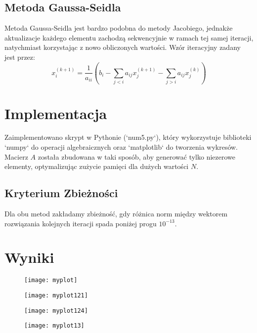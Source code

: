 \documentclass{article}
\begin{document}
\subsection{Metoda Gaussa-Seidla}
Metoda Gaussa-Seidla jest bardzo podobna do metody Jacobiego, jednakże aktualizacje każdego elementu zachodzą
sekwencyjnie w ramach tej samej iteracji, natychmiast korzystając z nowo obliczonych wartości. Wzór iteracyjny zadany jest przez:
\[
x_i^{(k+1)} = \frac{1}{a_{ii}} \left(b_i - \sum_{j < i} a_{ij} x_j^{(k+1)} - \sum_{j > i} a_{ij} x_j^{(k)} \right)
\]

\section{Implementacja}
Zaimplementowano skrypt w Pythonie (`num5.py`), który wykorzystuje biblioteki `numpy` do operacji algebraicznych oraz `matplotlib` do tworzenia wykresów.
Macierz \( A \) została zbudowana w taki sposób, aby generować tylko niezerowe elementy, optymalizując zużycie pamięci dla dużych wartości \( N \).

\subsection{Kryterium Zbieżności}
Dla obu metod zakładamy zbieżność, gdy różnica norm między wektorem rozwiązania kolejnych iteracji spada poniżej progu \(10^{-13}\).

\section{Wyniki}

\begin{figure}[H]
    \centering
    \texttt{[image: myplot]} %
    \label{fig:main-plot}
\end{figure}

\begin{figure}[H]
    \centering
    \begin{minipage}{0.7\textwidth}
        \centering
        \texttt{[image: myplot121]} %
        \label{fig:plot1}
    \end{minipage}
    \hfill
    \begin{minipage}{0.7\textwidth}
        \centering
        \texttt{[image: myplot124]} %
        \label{fig:plot2}
    \end{minipage}
    \begin{minipage}{0.7\textwidth}
        \centering
        \texttt{[image: myplot13]} %
        \label{fig:plot3}
    \end{minipage}
    \hfill
\end{figure}
\end{document}
